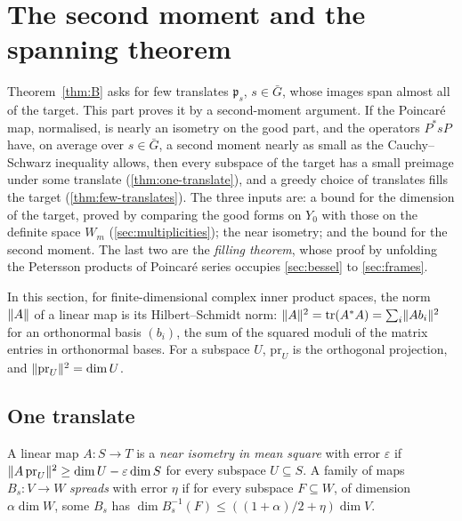 \section{The second moment and the spanning theorem}\label{sec:moment}

Theorem~\ref{thm:B} asks for few translates $\mathfrak p_s$, $s\in\bar G$, whose images span almost all of the target. This part proves it by a
second-moment argument. If the Poincar\'e map, normalised, is nearly an isometry on the good part, and the operators $P^*sP$ have, on
average over $s\in\bar G$, a second moment nearly as small as the Cauchy--Schwarz inequality allows, then every subspace of the target has
a small preimage under some translate (\cref{thm:one-translate}), and a greedy choice of translates fills the target
(\cref{thm:few-translates}). The three inputs are: a bound for the dimension of the target, proved by comparing the good forms on $Y_0$
with those on the definite space $W_m$ (\cref{sec:multiplicities}); the near isometry; and the bound for the second moment. The last two
are the \emph{filling theorem}, whose proof by unfolding the Petersson products of Poincar\'e series occupies \cref{sec:bessel}
to \cref{sec:frames}.

In this section, for finite-dimensional complex inner product spaces, the norm $\lVert A\rVert$ of a linear map is its Hilbert--Schmidt norm:
$\lVert A\rVert^2=\operatorname{tr}(A^*A)=\sum_i\lVert Ab_i\rVert^2$ for an orthonormal basis $(b_i)$, the sum of the squared moduli of the matrix entries in
orthonormal bases. For a subspace $U$, $\mathrm{pr}_U$ is the orthogonal projection, and $\lVert \mathrm{pr}_U\rVert^2=\dim U$.

\subsection{One translate}\label{ss:one-translate}
A linear map $A\colon S\to T$ is a \emph{near isometry in mean square} with error $\varepsilon$ if $\lVert A\,\mathrm{pr}_U\rVert^2\ge\dim U-\varepsilon\dim S$ for every subspace
$U\subseteq S$. A family of maps $B_s\colon V\to W$ \emph{spreads} with error $\eta$ if for every subspace $F\subseteq W$, of dimension $\alpha\dim W$, some $B_s$ has
$\dim B_s^{-1}(F)\le((1+\alpha)/2+\eta)\dim V$.

